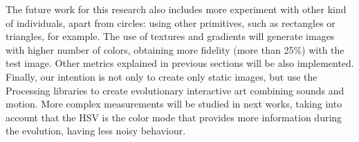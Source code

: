 The future work for this research also includes more experiment with other kind of individuals, apart from circles: using other primitives, such as rectangles or triangles, for example. The use of textures and gradients will generate images with higher number of colors, obtaining more fidelity (more than 25\%) with the test image. Other metrics explained in previous sections will be also implemented. Finally, our intention is not only to create only static images, but use the Processing libraries to create evolutionary interactive art combining sounds and motion. %
More complex measurements will be studied in next works, taking into
account that the HSV is the color mode that provides more information
during the evolution, having less noisy behaviour.

